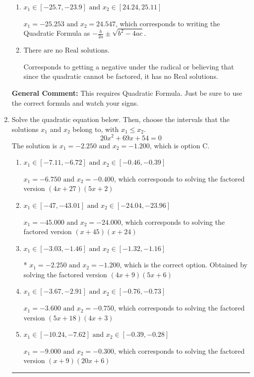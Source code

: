 \documentclass{extbook}[14pt]
\newcommand{\litem}[1]{\item #1

\rule{\textwidth}{0.4pt}}
\begin{document}
\begin{enumerate}
{\begin{enumerate}[label=\Alph*.]
* $x_1 = -1.085 \text{ and } x_2 = 0.379$, which is the correct option.
\item \( x_1 \in [-25.7, -23.9] \text{ and } x_2 \in [24.24, 25.11] \)

 $x_1 = -25.253 \text{ and } x_2 = 24.547$, which corresponds to writing the Quadratic Formula as $-\frac{b}{2a} \pm \sqrt{b^2 - 4ac}$.
\item \( \text{There are no Real solutions.} \)

Corresponds to getting a negative under the radical or believing that since the quadratic cannot be factored, it has no Real solutions.
\end{enumerate}

\textbf{General Comment:} This requires Quadratic Formula. Just be sure to use the correct formula and watch your signs.
}
\litem{
Solve the quadratic equation below. Then, choose the intervals that the solutions $x_1$ and $x_2$ belong to, with $x_1 \leq x_2$.
\[ 20x^{2} +69 x + 54 = 0 \]The solution is \( x_1 = -2.250 \text{ and } x_2 = -1.200 \), which is option C.\begin{enumerate}[label=\Alph*.]
\item \( x_1 \in [-7.11, -6.72] \text{ and } x_2 \in [-0.46, -0.39] \)

$x_1 = -6.750 \text{ and } x_2 = -0.400$, which corresponds to solving the factored version $(4x + 27)(5x + 2)$
\item \( x_1 \in [-47, -43.01] \text{ and } x_2 \in [-24.04, -23.96] \)

$x_1 = -45.000 \text{ and } x_2 = -24.000$, which corresponds to solving the factored version $(x + 45)(x + 24)$
\item \( x_1 \in [-3.03, -1.46] \text{ and } x_2 \in [-1.32, -1.16] \)

* $x_1 = -2.250 \text{ and } x_2 = -1.200$, which is the correct option. Obtained by solving the factored version $(4x + 9)(5x + 6)$
\item \( x_1 \in [-3.67, -2.91] \text{ and } x_2 \in [-0.76, -0.73] \)

$x_1 = -3.600 \text{ and } x_2 = -0.750$, which corresponds to solving the factored version $(5x + 18)(4x + 3)$
\item \( x_1 \in [-10.24, -7.62] \text{ and } x_2 \in [-0.39, -0.28] \)

$x_1 = -9.000 \text{ and } x_2 = -0.300$, which corresponds to solving the factored version $(x + 9)(20x + 6)$
\end{enumerate}

}
\end{enumerate}
\end{document}
